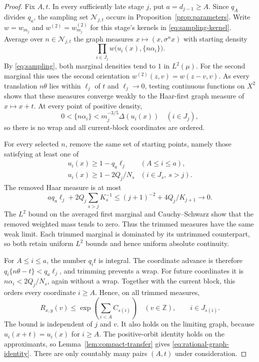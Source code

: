\begin{proof}
Fix $A,t$.  In every sufficiently late stage $j$, put $a=d_{j-1}\ge A$.
Since $q_A$ divides $q_a$, the sampling set $\mathcal N_{j,t}$ occurs in
Proposition~\ref{prop:parameters}.  Write $w=w_{m_j}$ and
$w^{(2)}=w_{m_j}^{(2)}$ for this stage's kernels in
\eqref{eq:sampling-kernel}.  Average over $n\in\mathcal N_{j,t}$
the graph measures $x\mapsto(x,\sigma^n x)$ with starting density
\[
 \prod_{i\in J_j}w\bigl(u_i(x),\{n\alpha_i\}\bigr).
\]
By \eqref{eq:sampling}, both marginal densities tend to $1$ in $L^2(\mu)$.
For the second marginal this uses the second orientation
$w^{(2)}(z,v)=w(z-v,v)$.  As every translation $n\theta$ lies within
$\ell_j$ of $t$ and $\ell_j\to0$, testing continuous functions on $X^2$
shows that these measures converge weakly to the Haar-first graph measure
of $x\mapsto x+t$.  At every point of positive density,
\[
 0<\{n\alpha_i\}<m_j^{-3/5}\Delta(u_i(x))\quad(i\in J_j),
\]
so there is no wrap and all current-block coordinates are ordered.

For every selected $n$, remove the same set of starting points, namely
those satisfying at least one of
\[
 \begin{array}{ll}
 u_i(x)\ge1-q_a\ell_j & (A\le i\le a),\\
 u_i(x)\ge1-2Q_j/N_s & (i\in J_s,\ s>j).
 \end{array}
\]
The removed Haar measure is at most
\[
 a q_a\ell_j+2Q_j\sum_{s>j}K_s^{-1}
 \le (j+1)^{-2}+4Q_j/K_{j+1}\longrightarrow0.
\]
The $L^2$ bound on the averaged first marginal and Cauchy--Schwarz show that the
removed weighted mass tends to zero.  Thus the trimmed measures have the
same weak limit.  Each trimmed marginal is dominated by its untrimmed
counterpart, so both retain uniform $L^2$ bounds and hence uniform absolute
continuity.

For $A\le i\le a$, the number $q_i t$ is integral.  The coordinate advance
is therefore $q_i\{n\theta-t\}<q_a\ell_j$, and trimming prevents a wrap.
For future coordinates it is $n\alpha_i<2Q_j/N_s$, again without a wrap.
Together with the current block, this orders every coordinate $i\ge A$.
Hence, on all trimmed measures,
\[
 R_{x,y}(v)\le
 \exp\left(\sum_{i<A}C_{s(i)}\right)\quad(v\in\mathbb Z),
 \qquad i\in J_{s(i)}.
\]
The bound is independent of $j$ and $v$.  It also holds on the limiting
graph, because $u_i(x+t)=u_i(x)$ for $i\ge A$.  The positive-orbit identity
holds on the approximants, so Lemma~\ref{lem:compact-transfer} gives
\eqref{eq:rational-graph-identity}.  There are only countably many pairs
$(A,t)$ under consideration.
\end{proof}
